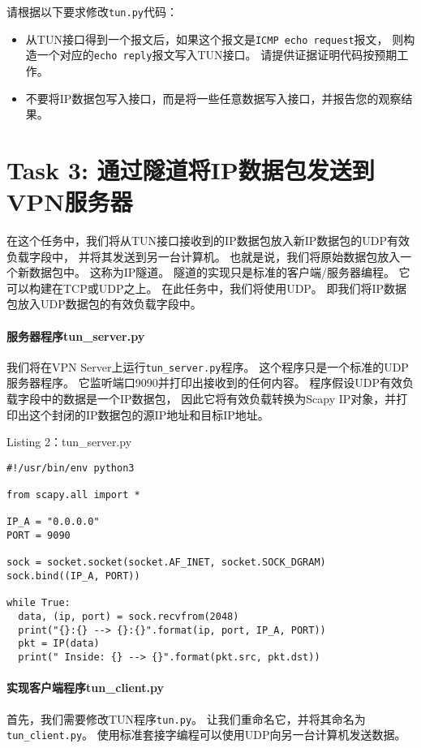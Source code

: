 请根据以下要求修改\verb|tun.py|代码：

\begin{itemize}
\item 从TUN接口得到一个报文后，如果这个报文是\verb|ICMP echo request|报文，
则构造一个对应的\verb|echo reply|报文写入TUN接口。 
请提供证据证明代码按预期工作。
\item 不要将IP数据包写入接口，而是将一些任意数据写入接口，并报告您的观察结果。
\end{itemize}


\section{Task 3: 通过隧道将IP数据包发送到VPN服务器} 

在这个任务中，我们将从TUN接口接收到的IP数据包放入新IP数据包的UDP有效负载字段中，
并将其发送到另一台计算机。 
也就是说，我们将原始数据包放入一个新数据包中。 
这称为IP隧道。 
隧道的实现只是标准的客户端/服务器编程。 
它可以构建在TCP或UDP之上。 
在此任务中，我们将使用UDP。 
即我们将IP数据包放入UDP数据包的有效负载字段中。

\paragraph{服务器程序tun\_server.py} 
我们将在VPN Server上运行\verb|tun_server.py|程序。
这个程序只是一个标准的UDP服务器程序。 
它监听端口9090并打印出接收到的任何内容。
程序假设UDP有效负载字段中的数据是一个IP数据包，
因此它将有效负载转换为Scapy IP对象，并打印出这个封闭的IP数据包的源IP地址和目标IP地址。

\begin{center}
Listing 2：tun\_server.py
\end{center}
\begin{lstlisting}
#!/usr/bin/env python3

from scapy.all import *

IP_A = "0.0.0.0"
PORT = 9090

sock = socket.socket(socket.AF_INET, socket.SOCK_DGRAM)
sock.bind((IP_A, PORT))

while True:
  data, (ip, port) = sock.recvfrom(2048)
  print("{}:{} --> {}:{}".format(ip, port, IP_A, PORT))
  pkt = IP(data)
  print(" Inside: {} --> {}".format(pkt.src, pkt.dst))
\end{lstlisting}


\paragraph{实现客户端程序tun\_client.py} 
首先，我们需要修改TUN程序\verb|tun.py|。 
让我们重命名它，并将其命名为\verb|tun_client.py|。 
使用标准套接字编程可以使用UDP向另一台计算机发送数据。 

